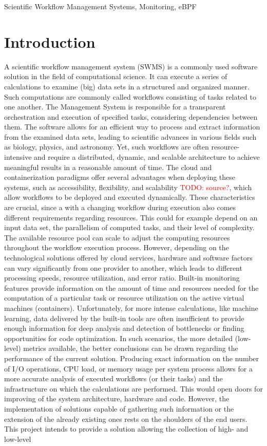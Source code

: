 \documentclass[lettersize,journal]{IEEEtran}
\newcommand{\todo}[1]{\textcolor{red}{TODO: #1}\PackageWarning{TODO:}{#1!}}
\begin{document}
\begin{IEEEkeywords}
	Scientific Workflow Management Systems, Monitoring, eBPF
\end{IEEEkeywords}

\section{Introduction}
A scientific workflow management system (SWMS) is a commonly used software solution in the field of computational science. It can execute a series of calculations to examine (big) data sets in a structured and organized manner. Such computations are commonly called workflows consisting of tasks related to one another. The Management System is responsible for a transparent orchestration and execution of specified tasks, considering dependencies between them. The software allows for an efficient way to process and extract information from the examined data sets, leading to scientific advances in various fields such as biology, physics, and astronomy\cite{challengesSW}. Yet, such workflows are often resource-intensive and require a distributed, dynamic, and scalable architecture to achieve meaningful results in a reasonable amount of time. The cloud and containerization paradigms offer several advantages when deploying these systems, such as accessibility, flexibility, and scalability \todo{source?}, which allow workflows to be deployed and executed dynamically. These characteristics are crucial, since a with a changing workflow during execution also comes different requirements regarding resources. This could for example depend on an input data set, the parallelism of computed tasks, and their level of complexity. The available resource pool can scale to adjust the computing resources throughout the workflow execution process. However, depending on the technological solutions offered by cloud services, hardware and software factors can vary significantly from one provider to another, which leads to different processing speeds, resource utilization, and error ratio\cite{compareCloud}. Built-in monitoring features provide information on the amount of time and resources needed for the computation of a particular task or resource utilization on the active virtual machines (containers). Unfortunately, for more intense calculations, like machine learning, data delivered by the built-in tools are often insufficient to provide enough information for deep analysis and detection of bottlenecks or finding opportunities for code optimization. In such scenarios, the more detailed (low-level) metrics available, the better conclusions can be drawn regarding the performance of the current solution. Producing exact information on the number of I/O operations, CPU load, or memory usage per system process allows for a more accurate analysis of executed workflows (or their tasks) and the infrastructure on which the calculations are performed. This would open doors for improving of the system architecture, hardware and code. However, the implementation of solutions capable of gathering such information or the extension of the already existing ones rests on the shoulders of the end users. This project intends to provide a solution allowing the collection of high- and low-level 
\end{document}
